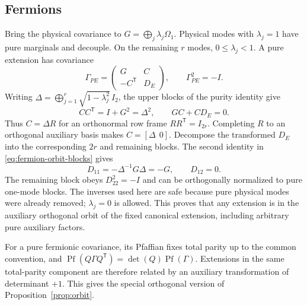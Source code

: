 \documentclass[11pt,a4paper]{article}
\numberwithin{equation}{section}
\theoremstyle{remark}
\newcommand{\T}{\mathsf T}
\begin{document}
\subsection{Fermions}
Bring the physical covariance to $G=\bigoplus_j\lambda_j\Omega_1$. Physical modes with $\lambda_j=1$ have pure marginals and decouple. On the remaining $r$ modes, $0\le\lambda_j<1$. A pure extension has covariance
\begin{equation}\label{eq:fermion-orbit}
 \Gamma_{PE}=\begin{pmatrix}G&C\\-C^{\T}&D_E\end{pmatrix},\qquad
 \Gamma_{PE}^2=-I.
\end{equation}
Writing $\Delta=\bigoplus_{j=1}^r\sqrt{1-\lambda_j^2}\,I_2$, the upper blocks of the purity identity give
\begin{equation}\label{eq:fermion-orbit-blocks}
 CC^{\T}=I+G^2=\Delta^2,\qquad GC+CD_E=0.
\end{equation}
Thus $C=\Delta R$ for an orthonormal row frame $RR^{\T}=I_{2r}$. Completing $R$ to an orthogonal auxiliary basis makes $C=[\Delta\ \ 0]$. Decompose the transformed $D_E$ into the corresponding $2r$ and remaining blocks. The second identity in \eqref{eq:fermion-orbit-blocks} gives
\begin{equation}
 D_{11}=-\Delta^{-1}G\Delta=-G,\qquad D_{12}=0.
\end{equation}
The remaining block obeys $D_{22}^2=-I$ and can be orthogonally normalized to pure one-mode blocks. The inverses used here are safe because pure physical modes were already removed; $\lambda_j=0$ is allowed. This proves that any extension is in the auxiliary orthogonal orbit of the fixed canonical extension, including arbitrary pure auxiliary factors.

For a pure fermionic covariance, its Pfaffian fixes total parity up to the common convention, and $\operatorname{Pf}(Q\Gamma Q^{\T})=\det(Q)\operatorname{Pf}(\Gamma)$. Extensions in the same total-parity component are therefore related by an auxiliary transformation of determinant $+1$. This gives the special orthogonal version of Proposition~\ref{prop:orbit}.
\end{document}
